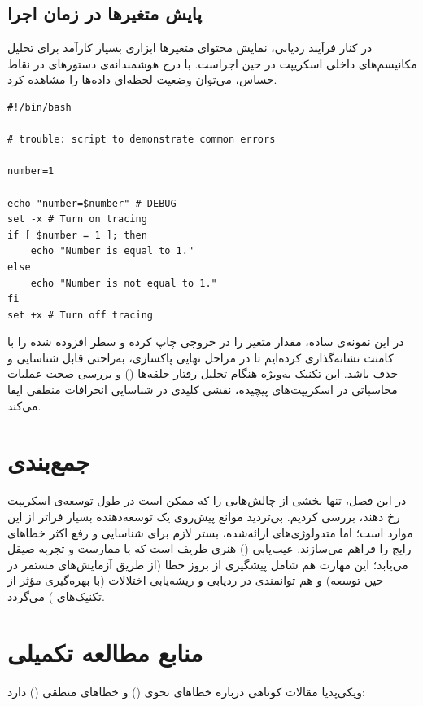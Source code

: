 \subsection{پایش متغیرها در زمان اجرا}

در کنار فرآیند ردیابی، نمایش محتوای متغیرها ابزاری بسیار کارآمد برای تحلیل مکانیسم‌های داخلی اسکریپت در حین اجراست. با درج هوشمندانه‌ی دستورهای  در نقاط حساس، می‌توان وضعیت لحظه‌ای داده‌ها را مشاهده کرد.

\begin{latin}
\begin{lstlisting}
#!/bin/bash

# trouble: script to demonstrate common errors

number=1

echo "number=$number" # DEBUG
set -x # Turn on tracing
if [ $number = 1 ]; then
    echo "Number is equal to 1."
else
    echo "Number is not equal to 1."
fi
set +x # Turn off tracing
\end{lstlisting}
\end{latin}

در این نمونه‌ی ساده، مقدار متغیر  را در خروجی چاپ کرده و سطر افزوده شده را با کامنت  نشانه‌گذاری کرده‌ایم تا در مراحل نهایی پاکسازی، به‌راحتی قابل شناسایی و حذف باشد. این تکنیک به‌ویژه هنگام تحلیل رفتار حلقه‌ها () و بررسی صحت عملیات محاسباتی در اسکریپت‌های پیچیده، نقشی کلیدی در شناسایی انحرافات منطقی ایفا می‌کند.

\section{جمع‌بندی}

در این فصل، تنها بخشی از چالش‌هایی را که ممکن است در طول توسعه‌ی اسکریپت رخ دهند، بررسی کردیم. بی‌تردید موانع پیش‌روی یک توسعه‌دهنده بسیار فراتر از این موارد است؛ اما متدولوژی‌های ارائه‌شده، بستر لازم برای شناسایی و رفع اکثر خطاهای رایج را فراهم می‌سازند. عیب‌یابی () هنری ظریف است که با ممارست و تجربه صیقل می‌یابد؛ این مهارت هم شامل پیشگیری از بروز خطا (از طریق آزمایش‌های مستمر در حین توسعه) و هم توانمندی در ردیابی و ریشه‌یابی اختلالات (با بهره‌گیری مؤثر از تکنیک‌های ) می‌گردد.

\section{منابع مطالعه تکمیلی}

ویکی‌پدیا مقالات کوتاهی درباره خطاهای نحوی () و خطاهای منطقی () دارد:

